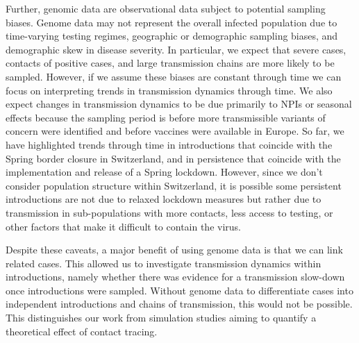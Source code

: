 \documentclass[9pt,twoside,lineno]{pnas-new} %
\begin{document}
Further, genomic data are observational data subject to potential sampling biases. Genome data may not represent the overall infected population due to time-varying testing regimes, geographic or demographic sampling biases, and demographic skew in disease severity. In particular, we expect that severe cases, contacts of positive cases, and large transmission chains are more likely to be sampled. However, if we assume these biases are constant through time we can focus on interpreting trends in transmission dynamics through time. We also expect changes in transmission dynamics to be due primarily to NPIs or seasonal effects because the sampling period is before more transmissible variants of concern were identified and before vaccines were available in Europe. So far, we have highlighted trends through time in introductions that coincide with the Spring border closure in Switzerland, and in persistence that coincide with the implementation and release of a Spring lockdown. However, since we don't consider population structure within Switzerland, it is possible some persistent introductions are not due to relaxed lockdown measures but rather due to transmission in sub-populations with more contacts, less access to testing, or other factors that make it difficult to contain the virus.

Despite these caveats, a major benefit of using genome data is that we can link related cases. This allowed us to investigate transmission dynamics within introductions, namely whether there was evidence for a transmission slow-down once introductions were sampled. Without genome data to differentiate cases into independent introductions and chains of transmission, this would not be possible. This distinguishes our work from simulation studies aiming to quantify a theoretical effect of contact tracing. 
\end{document}
